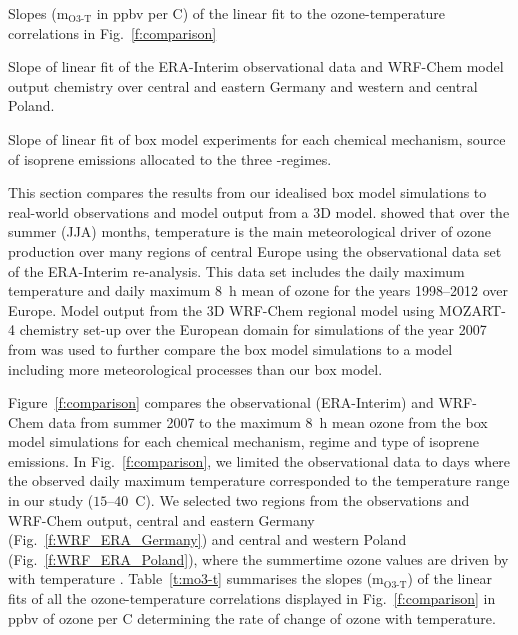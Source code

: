 \begin{table}[t]%
    \centering%
    \caption{Slopes (m$_{\text{O3-T}}$ in ppbv per \degree C) of the linear fit to the ozone-temperature correlations in Fig.~\ref{f:comparison}}%
    \label{t:mo3-t}%
    \begin{subtable}[t]{\textwidth}%
        \centering%
        \vspace{2mm}%
        \caption{Slope of linear fit of the ERA-Interim observational data and WRF-Chem model output chemistry over central and eastern Germany and western and central Poland.}%
        \label{t:era_wrf_o3-T}%
    \end{subtable}
    \begin{subtable}[t]{\textwidth}%
        \centering%
        \vspace{2mm}
        \caption{Slope of linear fit of box model experiments for each chemical mechanism, source of isoprene emissions allocated to the three -regimes.}%
        \label{t:boxmodel_o3-T}%
    \end{subtable}
\end{table} 

This section compares the results from our idealised box model simulations to real-world observations and model output from a 3D model.
\citet{Otero:2016} showed that over the summer (JJA) months, temperature is the main meteorological driver of ozone production over many regions of central Europe using the observational data set of the ERA-Interim re-analysis.
This data set includes the daily maximum temperature and daily maximum 8~h mean of ozone for the years 1998--2012 over Europe.
Model output from the 3D WRF-Chem regional model using MOZART-4 chemistry set-up over the European domain for simulations of the year 2007 from \citet{Mar:2016} was used to further compare the box model simulations to a model including more meteorological processes than our box model.

Figure~\ref{f:comparison} compares the observational (ERA-Interim) and WRF-Chem data from summer 2007 to the maximum 8~h mean ozone from the box model simulations for each chemical mechanism,  regime and type of isoprene emissions.
In Fig.~\ref{f:comparison}, we limited the observational data to days where the observed daily maximum temperature corresponded to the temperature range in our study ($15$--$40$~\degree C).
We selected two regions from the observations and WRF-Chem output, central and eastern Germany (Fig.~\ref{f:WRF_ERA_Germany}) and central and western Poland (Fig.~\ref{f:WRF_ERA_Poland}), where the summertime ozone values are driven by with temperature \citep{Otero:2016}.
Table~\ref{t:mo3-t} summarises the slopes (m$_{\text{O3-T}}$) of the linear fits of all the ozone-temperature correlations displayed in Fig.~\ref{f:comparison} in ppbv of ozone per \degree C determining the rate of change of ozone with temperature.

